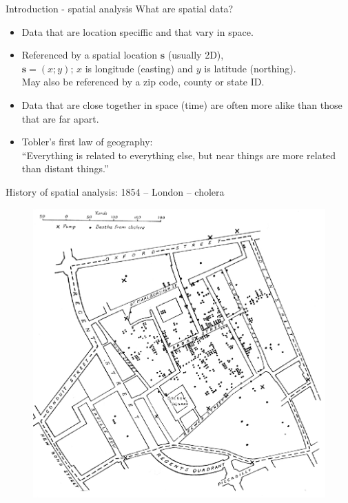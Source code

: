 \documentclass{beamer}
\begin{document}
\begin{frame}{Introduction - spatial analysis}
 What are spatial data?\\
\bigskip
\begin{itemize}
    \item Data that are location speciffic and that vary in space.
    \medskip
    \item Referenced by a spatial location $\bm{s}$ (usually 2D),  \\$\bm{s} = (x; y)$; $x$ is longitude (easting) and $y$ is latitude (northing). \\ \medskip
    May also be referenced by a zip code, county or state ID.
    \medskip
    \item Data that are close together in space (time) are often more alike than those that are far apart.
    \medskip
    \item Tobler's first law of geography: \\ ``Everything is related to everything else, but near things are more related than distant things.''
\end{itemize}
\end{frame}
\begin{frame}{History of spatial analysis: 1854 -- London -- cholera}
\vspace{-0.5cm}
\begin{figure}
	\includegraphics[width=.65\textwidth]{IMG/sp_cholera.eps}
\end{figure}
\end{frame}
\end{document}
